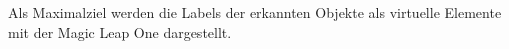 Als Maximalziel werden die Labels der erkannten Objekte als virtuelle Elemente mit der Magic Leap One dargestellt.
%
%



